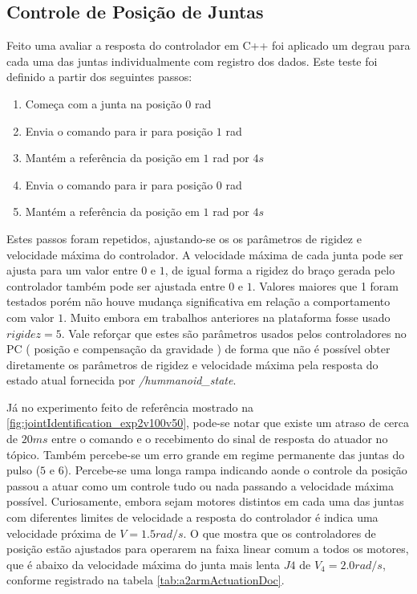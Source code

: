 \subsection{Controle de Posição de Juntas}\label{subsec:stepcpp}

Feito uma avaliar a resposta do controlador em C++ foi aplicado um degrau para cada uma das juntas individualmente com registro dos dados. Este teste foi definido a partir dos seguintes passos:

\begin{enumerate}
    \item Começa com a junta na posição $0$ rad
    \item Envia o comando para ir para posição $1$ rad
    \item Mantém a referência da posição em $1$ rad por $4s$
    \item Envia o comando para ir para posição $0$ rad
    \item Mantém a referência da posição em $1$ rad por $4s$
\end{enumerate}

Estes passos foram repetidos, ajustando-se os os parâmetros de rigidez e velocidade máxima do controlador. A velocidade máxima de cada junta pode ser ajusta para um valor entre $0$ e $1$, de igual forma a rigidez do braço gerada pelo controlador também pode ser ajustada entre $0$ e $1$. Valores maiores que 1 foram testados porém não houve mudança significativa em relação a comportamento com valor $1$. Muito embora em trabalhos anteriores na plataforma fosse usado $rigidez = 5$. Vale reforçar que estes são parâmetros usados pelos controladores no PC ( posição e compensação da gravidade ) de forma que não é possível obter diretamente os parâmetros de rigidez e velocidade máxima pela resposta do estado atual fornecida por \textit{/hummanoid\_state}.

Já no experimento feito de referência mostrado na \ref{fig:jointIdentification_exp2v100v50}, pode-se notar que existe um atraso de cerca de $20ms$ entre o comando e o recebimento do sinal de resposta do atuador no tópico. Também percebe-se um erro grande em regime permanente das juntas do pulso ($5$ e $6$). Percebe-se uma longa rampa indicando aonde o controle da posição passou a atuar como um controle tudo ou nada passando a velocidade máxima possível. Curiosamente, embora sejam motores distintos em cada uma das juntas com diferentes limites de velocidade a resposta do controlador é indica uma velocidade próxima de $V = 1.5 rad/s$. O que mostra que os controladores de posição estão ajustados para operarem na faixa linear comum a todos os motores, que é abaixo da velocidade máxima do junta mais lenta $J4$ de $V_4 = 2.0 rad/s$, conforme registrado na tabela \ref{tab:a2armActuationDoc}.

